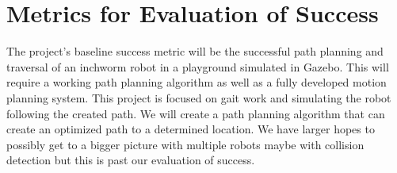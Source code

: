 \section{Metrics for Evaluation of Success}
The project’s baseline success metric will be the successful path planning and traversal of an inchworm robot in a playground simulated in Gazebo. This will require a working path planning algorithm as well as a fully developed motion planning system. This project is focused on gait work and simulating the robot following the created path. We will create a path planning algorithm that can create an optimized path to a determined location. We have larger hopes to possibly get to a bigger picture with multiple robots maybe with collision detection but this is past our evaluation of success.